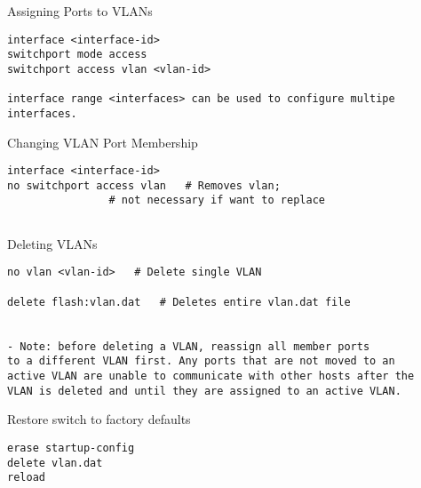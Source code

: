 \documentclass[../EngineeringJournal_CDavis.tex]{subfiles}
\begin{document}
\hspace{0.2cm}
\begin{tcolorbox}[width=6.3in]
Assigning Ports to VLANs
\scriptsize 
\begin{verbatim}
interface <interface-id>
switchport mode access
switchport access vlan <vlan-id>

interface range <interfaces> can be used to configure multipe interfaces.
\end{verbatim}
\end{tcolorbox}
\hspace{0.2cm}
\normalsize  



\hspace{0.2cm}
\begin{tcolorbox}[width=6.3in]
Changing VLAN Port Membership
\scriptsize 
\begin{verbatim}
interface <interface-id>
no switchport access vlan	# Removes vlan; 
				# not necessary if want to replace
  
\end{verbatim}
\end{tcolorbox}
\hspace{0.2cm}
\normalsize  




\hspace{0.2cm}
\begin{tcolorbox}[width=6.3in]
Deleting VLANs
\scriptsize 
\begin{verbatim}
no vlan <vlan-id>	# Delete single VLAN

delete flash:vlan.dat	# Deletes entire vlan.dat file


- Note: before deleting a VLAN, reassign all member ports 
to a different VLAN first. Any ports that are not moved to an 
active VLAN are unable to communicate with other hosts after the 
VLAN is deleted and until they are assigned to an active VLAN.
\end{verbatim}
\normalsize
Restore switch to factory defaults
\scriptsize
\begin{verbatim}
erase startup-config
delete vlan.dat
reload
\end{verbatim}
\end{tcolorbox}
\hspace{0.2cm}
\normalsize  
\end{document}
